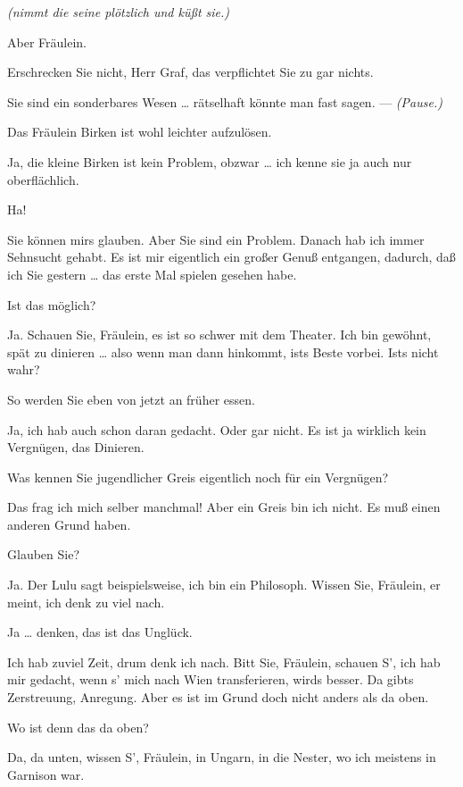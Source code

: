 \documentclass[
	final,
	a4paper,
	ngerman,
	mpinclude = true, %
	twoside = true,
	open = right,
	cleardoublepage = plain,
	DIV = 13,
	BCOR = 1cm,
	titlepage = firstiscover,
	]{scrbook}
\newcommand{\direction}[1]{\textit{(#1)}}
\newcommand{\thecharacter}[1]{\textup{\textsc{#1}}\xspace}
\newcommand{\theschauspielerin}{\thecharacter{Schauspielerin}}
\newcommand{\thegraf}{\thecharacter{Graf}}
\newcommand{\character}[1]{\item[#1:]}
\newcommand{\schauspielerin}{\character{\theschauspielerin}}
\newcommand{\graf}{\character{\thegraf}}
\begin{document}
\begin{play}
	\schauspielerin
	\direction{nimmt die seine plötzlich und küßt sie.}

	\graf
	Aber Fräulein.

	\schauspielerin
	Erschrecken Sie nicht, Herr Graf, das verpflichtet Sie zu gar nichts.

	\graf
	Sie sind ein sonderbares Wesen \ldots{} rätselhaft könnte man fast sagen. --- \direction{Pause.}

	\schauspielerin
	Das Fräulein Birken ist wohl leichter aufzulösen.

	\graf
	Ja, die kleine Birken ist kein Problem, obzwar \ldots{} ich kenne sie ja auch nur oberflächlich.

	\schauspielerin
	Ha!

	\graf
	Sie können mirs glauben. Aber Sie sind ein Problem. Danach hab ich immer Sehnsucht gehabt. Es ist mir eigentlich ein großer Genuß entgangen, dadurch, daß ich Sie gestern \ldots{} das erste Mal spielen gesehen habe.

	\schauspielerin
	Ist das möglich?

	\graf
	Ja. Schauen Sie, Fräulein, es ist so schwer mit dem Theater. Ich bin gewöhnt, spät zu dinieren \ldots{} also wenn man dann hinkommt, ists Beste vorbei. Ists nicht wahr?

	\schauspielerin
	So werden Sie eben von jetzt an früher essen.

	\graf
	Ja, ich hab auch schon daran gedacht. Oder gar nicht. Es ist ja wirklich kein Vergnügen, das Dinieren.

	\schauspielerin
	Was kennen Sie jugendlicher Greis eigentlich noch für ein Vergnügen?

	\graf
	Das frag ich mich selber manchmal! Aber ein Greis bin ich nicht. Es muß einen anderen Grund haben.

	\schauspielerin
	Glauben Sie?

	\graf
	Ja. Der Lulu sagt beispielsweise, ich bin ein Philosoph. Wissen Sie, Fräulein, er meint, ich denk zu viel nach.

	\schauspielerin
	Ja \ldots{} denken, das ist das Unglück.

	\graf
	Ich hab zuviel Zeit, drum denk ich nach. Bitt Sie, Fräulein, schauen S', ich hab mir gedacht, wenn s' mich nach Wien transferieren, wirds besser. Da gibts Zerstreuung, Anregung. Aber es ist im Grund doch nicht anders als da oben.

	\schauspielerin
	Wo ist denn das da oben?

	\graf
	Da, da unten, wissen S', Fräulein, in Ungarn, in die Nester, wo ich meistens in Garnison war.


\end{play}
\end{document}
